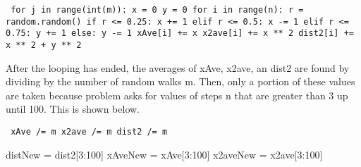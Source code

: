 \documentclass[12pt]{article}
\begin{document}
{\tt 	
\noindent for j in range(int(m)):           \newline
\indent x = 0                           \newline           
\indent	y = 0                                   \newline        
	\indent	for i in range(n):                  \newline
\indent	\indent	r = random.random()             \newline
\indent	\indent	if r <= 0.25:                           \newline
\indent	\indent \indent	x += 1                                  \newline
\indent	\indent	elif r <= 0.5:                          \newline
\indent	\indent \indent	x -= 1                                  \newline
\indent	\indent	elif r <= 0.75:                         \newline
\indent	\indent \indent	y += 1                                  \newline
\indent	\indent	else:                                   \newline
\indent	\indent \indent	y -= 1                                  \newline
\indent	\indent	xAve[i] += x                            \newline               
\indent	\indent	x2ave[i] += x ** 2                      \newline
\indent	\indent	dist2[i] += x ** 2 + y ** 2             \newline
		}

\noindent After the looping has ended, the averages of xAve, x2ave, an dist2 are found by dividing by the number of random walks m. Then, only a portion of these values are taken because problem asks for values of steps n that are greater than 3 up until 100. This is shown below. \newline 

{\tt 
\noindent xAve /= m                   \newline
\noindent x2ave /= m                  \newline
\noindent dist2 /= m                  \newline

\noindent distNew = dist2[3:100]      \newline                    
\noindent xAveNew = xAve[3:100]       \newline                     
\noindent x2aveNew = x2ave[3:100]                   
}
\end{document}

